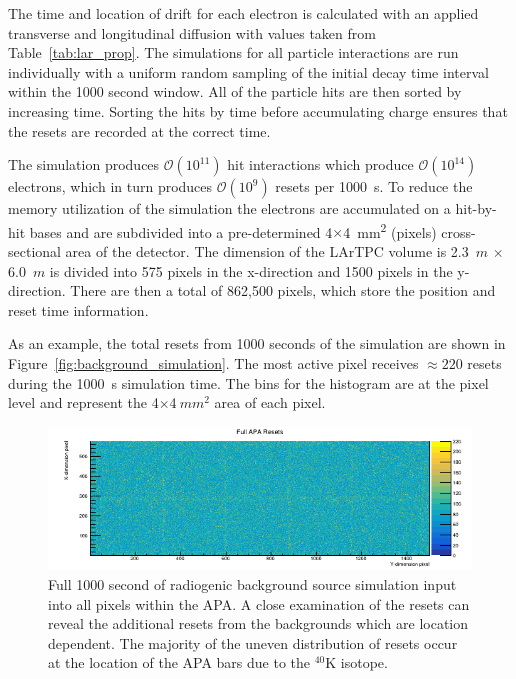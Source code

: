The time and location of drift for each electron is calculated with an applied transverse and longitudinal diffusion with values taken from Table~\ref{tab:lar_prop}.
The simulations for all particle interactions are run individually with a uniform random sampling of the initial decay time interval within the 1000 second window.
All of the particle hits are then sorted by increasing time.
Sorting the hits by time before accumulating charge ensures that the resets are recorded at the correct time.

The simulation produces $\mathcal{O}(10^{11})$ hit interactions which produce $\mathcal{O}(10^{14})$ electrons, which in turn produces $\mathcal{O}(10^{9})$ resets per 1000~\unit{s}.
To reduce the memory utilization of the simulation the electrons are accumulated on a hit-by-hit bases and are subdivided into a pre-determined 4$\times$4~\unit{mm^2} (pixels) cross-sectional area of the detector.
The dimension of the LArTPC volume is 2.3~$\unit{m}$ $\times$ 6.0~$\unit{m}$ is divided into 575 pixels in the x-direction and 1500 pixels in the y-direction.
There are then a total of 862,500 pixels, which store the position and reset time information.

As an example, the total resets from 1000 seconds of the simulation are shown in Figure~\ref{fig:background_simulation}.
The most active pixel receives $\approx 220$ resets during the 1000~\unit{s} simulation time.
The bins for the histogram are at the pixel level and represent the 4$\times$4$~\unit{mm^{2}}$ area of each pixel.

\begin{figure}[]
\centering
\includegraphics[width=\textwidth]{images/fullApaResets.png}
\caption{Full 1000 second of radiogenic background source simulation input into all pixels within the APA.
A close examination of the resets can reveal the additional resets from the backgrounds which are location dependent.
The majority of the uneven distribution of resets occur at the location of the APA bars due to the $^{40}$K isotope.
}
\end{figure}~\label{fig:background_simulation}

